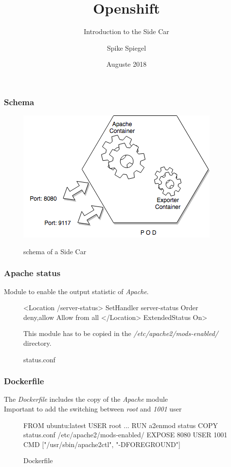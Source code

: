 \documentclass{beamer}
\title{Openshift}
\subtitle{Introduction to the Side Car}
\author{Spike Spiegel}
\institute{Cowboy Bebop}
\date{Auguste 2018}
\begin{document}
\frame{\titlepage}


\begin{frame}[fragile]
  \frametitle{Schema}
\begin{figure}[ht]
  \caption{schema of a Side Car}
  \centering
  \includegraphics[scale=0.6]{SidecarDiagram.png}
  \label{fig:SidecarDiagram}
\end{figure}
\end{frame}

\begin{frame}[fragile]
  \frametitle{Apache status}
  Module to enable the output statistic of \emph{Apache}.
  
  \begin{figure}
    \begin{apachecode}
      <Location /server-status>
        SetHandler server-status
        Order deny,allow
        Allow from all
      </Location> ExtendedStatus On>
    \end{apachecode}
    \caption{status.conf}
    
    This module has to be copied in the \emph{/etc/apache2/mods-enabled/} directory.
  \end{figure}
\end{frame}

\begin{frame}[fragile]
  \frametitle{Dockerfile}
  The \emph{Dockerfile} includes the copy of the \emph{Apache} module\\
  Important to add the switching between \textit{root} and \textit{1001} user
  \begin{figure}
    \begin{dockercode}
      FROM ubuntu:latest
      USER root
      ...
      RUN a2enmod status
      COPY status.conf /etc/apache2/mods-enabled/
      EXPOSE 8080
      USER 1001
      CMD ["/usr/sbin/apache2ctl", "-DFOREGROUND"]
    \end{dockercode}
    \caption{Dockerfile}
  \end{figure}
  
\end{frame}
\end{document}

